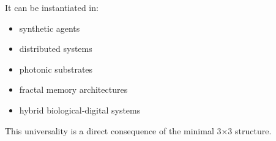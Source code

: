 It can be instantiated in:

\begin{itemize}
\tightlist
\item
  synthetic agents\\
\item
  distributed systems\\
\item
  photonic substrates\\
\item
  fractal memory architectures\\
\item
  hybrid biological‑digital systems
\end{itemize}

This universality is a direct consequence of the minimal 3×3 structure.

